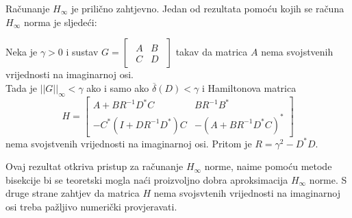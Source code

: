 Računanje $H_\infty$ je prilično zahtjevno. Jedan od rezultata pomoću kojih se računa $H_\infty$ norma je sljedeći:
\begin{lem}
    Neka je $\gamma >0$ i sustav $G = \begin{bmatrix}
        \begin{array}{c|c}
           A & B \\
          \hline
          C & D
        \end{array}
    \end{bmatrix}$ takav da matrica $A$ nema svojstvenih vrijednosti na imaginarnoj osi. \\
    Tada je $||G||_\infty < \gamma$ ako i samo ako $\overline{\delta}(D) < \gamma$ i Hamiltonova matrica
    \begin{equation*}
        H = \begin{bmatrix}        
           A + B R^{-1} D^* C & BR^{-1}B^* \\
          -C^*(I + DR^{-1}D^*)C & -(A+BR^{-1}D^*C)^*
    \end{bmatrix}
    \end{equation*} nema svojstvenih vrijednosti na imaginarnoj osi. Pritom je $R = \gamma^2 - D^*D$.
\end{lem}
Ovaj rezultat otkriva pristup za računanje $H_\infty$ norme, naime pomoću metode bisekcije bi se teoretski mogla naći proizvoljno dobra aproksimacija $H_\infty$ norme. S druge strane zahtjev da matrica $H$ nema svojsvtenih vrijednosti na imaginarnoj osi treba pažljivo numerički provjeravati.

